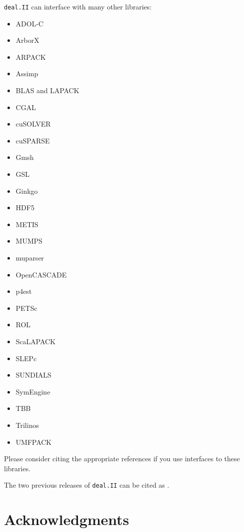 \documentclass{ansarticle-preprint}
\newcommand{\specialword}[1]{\texttt{#1}}
\newcommand{\dealii}{{\specialword{deal.II}}\xspace}
\begin{document}
\dealii{} can interface with many other libraries:
\begin{multicols}{3}
  \begin{itemize}[leftmargin=4mm]
    \item ADOL-C \cite{Griewank1996a,adol-c}
    \item ArborX \cite{lebrun2020arborx}
    \item ARPACK \cite{arpack}
    \item Assimp \cite{assimp}
    \item BLAS and LAPACK \cite{lapack}
    \item CGAL \cite{cgal}
    \item cuSOLVER \cite{cusolver}
    \item cuSPARSE \cite{cusparse}
    \item Gmsh \cite{geuzaine2009gmsh}
    \item GSL \cite{gsl2016}
    \item Ginkgo \cite{ginkgo-web-page}
    \item HDF5 \cite{hdf5}
    \item METIS \cite{karypis1998fast}
    \item MUMPS \cite{ADE00,MUMPS:1,MUMPS:2,mumps-web-page}
    \item muparser \cite{muparser-web-page}
    \item OpenCASCADE \cite{opencascade-web-page}
    \item p4est \cite{p4est}
    \item PETSc \cite{petsc-user-ref,petsc-web-page}
    \item ROL \cite{ridzal2014rapid}
    \item ScaLAPACK \cite{slug}
    \item SLEPc \cite{Hernandez:2005:SSF}
    \item SUNDIALS \cite{sundials}
    \item SymEngine \cite{symengine-web-page}
    \item TBB \cite{Rei07}
    \item Trilinos \cite{trilinos,trilinos-web-page}
    \item UMFPACK \cite{umfpack}
  \end{itemize}
\end{multicols}
Please consider citing the appropriate references if you use
interfaces to these libraries.

The two previous releases of \dealii{} can be cited as
\cite{dealII92,dealII93}.


\section{Acknowledgments}
\end{document}

